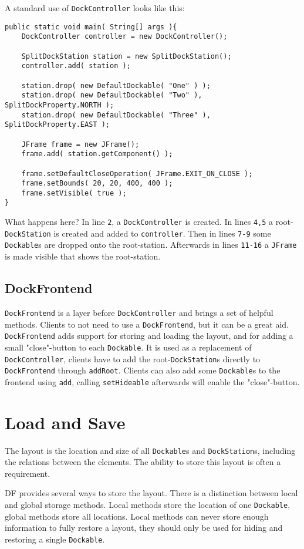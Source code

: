 \documentclass[a4paper,10pt]{article}
\newcommand{\src}[1]{\lstinline[basicstyle=\normalsize\ttfamily,keywordstyle=\normalsize\ttfamily,identifierstyle=\normalsize\ttfamily]|#1|}
\begin{document}
A standard use of \src{DockController} looks like this:
\begin{lstlisting}
public static void main( String[] args ){
	DockController controller = new DockController();
	
	SplitDockStation station = new SplitDockStation();
	controller.add( station );
		
	station.drop( new DefaultDockable( "One" ) );
	station.drop( new DefaultDockable( "Two" ), SplitDockProperty.NORTH );
	station.drop( new DefaultDockable( "Three" ), SplitDockProperty.EAST );

	JFrame frame = new JFrame();
	frame.add( station.getComponent() );
		
	frame.setDefaultCloseOperation( JFrame.EXIT_ON_CLOSE );
	frame.setBounds( 20, 20, 400, 400 );
	frame.setVisible( true );
}
\end{lstlisting}
What happens here? In line \src{2}, a \src{DockController} is created. In lines \src{4,5} a root-\src{DockStation} is created and added to \src{controller}. Then in lines \src{7-9} some \src{Dockable}s are dropped onto the root-station. Afterwards in lines \src{11-16} a \src{JFrame} is made visible that shows the root-station.

\subsection{DockFrontend}
\src{DockFrontend} is a layer before \src{DockController} and brings a set of helpful methods. Clients to not need to use a  \src{DockFrontend}, but it can be a great aid. \src{DockFrontend} adds support for storing and loading the layout, and for adding a small "close"-button to each \src{Dockable}. It is used as a replacement of \src{DockController}, clients have to add the root-\src{DockStation}s directly to \src{DockFrontend} through \src{addRoot}. Clients can also add some \src{Dockable}s to the frontend using \src{add}, calling \src{setHideable} afterwards will enable the "close"-button.

\section{Load and Save}
The layout is the location and size of all \src{Dockable}s and \src{DockStation}s, including the relations between the elements. The ability to store this layout is often a requirement. 

DF provides several ways to store the layout. There is a distinction between local and global storage methods. Local methods store the location of one \src{Dockable}, global methods store all locations. Local methods can never store enough information to fully restore a layout, they should only be used for hiding and restoring a single \src{Dockable}.
\end{document}
